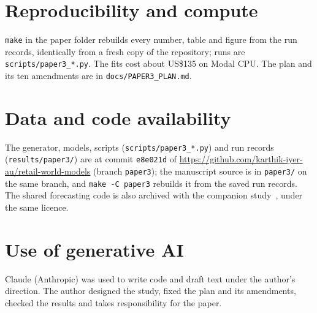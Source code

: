 \section{Reproducibility and compute}\label{sec:repro}

\texttt{make} in the paper folder rebuilds every number, table and figure from the run records, identically from a
fresh copy of the repository; runs are \texttt{scripts/paper3\_*.py}. The \nFits{} fits cost about US\$135 on Modal
CPU. The plan and its ten amendments are in \texttt{docs/PAPER3\_PLAN.md}.

\section{Data and code availability}\label{sec:avail}

The generator, models, scripts (\texttt{scripts/paper3\_*.py}) and run records (\texttt{results/paper3/}) are at commit
\texttt{e8e021d} of \url{https://github.com/karthik-iyer-au/retail-world-models} (branch \texttt{paper3}); the manuscript
source is in \texttt{paper3/} on the same branch, and \texttt{make -C paper3} rebuilds it from the saved run records. The shared forecasting code is also archived with the companion study~\cite{rwm},
under the same licence.

\section*{Use of generative AI}
Claude (Anthropic) was used to write code and draft text under the author's direction. The author designed the study,
fixed the plan and its amendments, checked the results and takes responsibility for the paper.

